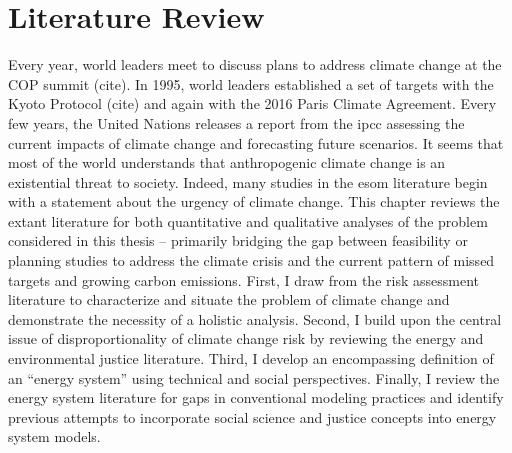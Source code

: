 \chapter{Literature Review}
Every year, world leaders meet to discuss plans to address climate change at the 
COP summit (cite).
In 1995, world leaders established a set of targets with the Kyoto Protocol 
(cite) and again with the 2016 Paris Climate Agreement. Every few years, the 
United Nations releases a report from the \ac{ipcc} assessing the current impacts
of climate change and forecasting future scenarios. It seems that most of the 
world understands that anthropogenic climate change is an existential threat to 
society. Indeed, many studies in the \ac{esom} literature begin with a statement
about the urgency of climate change. 
This chapter reviews the extant literature for both quantitative and qualitative
analyses of the problem considered in this thesis -- primarily bridging the gap 
between feasibility or planning studies to address the climate crisis and the current pattern of missed targets and growing carbon emissions.
First, I draw from the risk assessment literature to characterize and situate the problem of climate change and demonstrate the necessity of a holistic analysis. Second, I build upon the central issue of disproportionality of climate change risk by reviewing the energy and environmental justice literature. Third, I develop an encompassing definition of an ``energy system'' using technical and social perspectives. Finally, I review the energy system literature for gaps in conventional modeling practices and identify previous attempts to incorporate social science and justice concepts into energy system models.




% 
